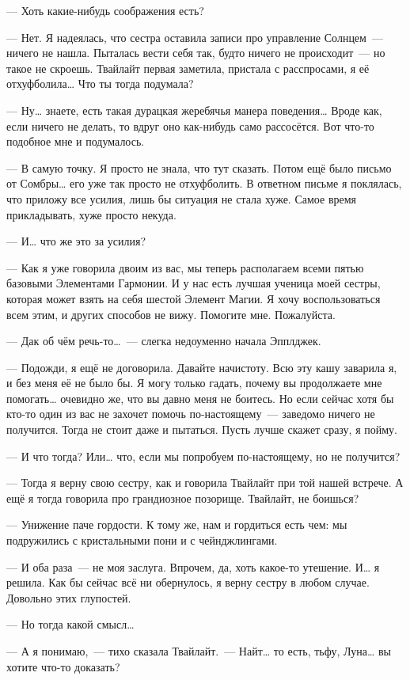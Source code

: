 \documentclass[twoside,a5paper,12pt]{extbook}
\begin{document}
— Хоть какие-нибудь соображения есть?

— Нет. Я надеялась, что сестра оставила записи про управление Солнцем — ничего не нашла. Пыталась вести себя так, будто ничего не происходит — но такое не скроешь. Твайлайт первая заметила, пристала с расспросами, я её отхуфболила… Что ты тогда подумала?

— Ну… знаете, есть такая дурацкая жеребячья манера поведения… Вроде как, если ничего не делать, то вдруг оно как-нибудь само рассосётся. Вот что-то подобное мне и подумалось.

— В самую точку. Я просто не знала, что тут сказать. Потом ещё было письмо от Сомбры… его уже так просто не отхуфболить. В ответном письме я поклялась, что приложу все усилия, лишь бы ситуация не стала хуже. Самое время прикладывать, хуже просто некуда.

— И… что же это за усилия?

— Как я уже говорила двоим из вас, мы теперь располагаем всеми пятью базовыми Элементами Гармонии. И у нас есть лучшая ученица моей сестры, которая может взять на себя шестой Элемент Магии. Я хочу воспользоваться всем этим, и других способов не вижу. Помогите мне. Пожалуйста.

— Дак об чём речь-то… — слегка недоуменно начала Эпплджек.

— Подожди, я ещё не договорила. Давайте начистоту. Всю эту кашу заварила я, и без меня её не было бы. Я могу только гадать, почему вы продолжаете мне помогать… очевидно же, что вы давно меня не боитесь. Но если сейчас хотя бы кто-то один из вас не захочет помочь по-настоящему — заведомо ничего не получится. Тогда не стоит даже и пытаться. Пусть лучше скажет сразу, я пойму.

— И что тогда? Или… что, если мы попробуем по-настоящему, но не получится?

— Тогда я верну свою сестру, как и говорила Твайлайт при той нашей встрече. А ещё я тогда говорила про грандиозное позорище. Твайлайт, не боишься?

— Унижение паче гордости. К тому же, нам и гордиться есть чем: мы подружились с кристальными пони и с чейнджлингами.

— И оба раза — не моя заслуга. Впрочем, да, хоть какое-то утешение. И… я решила. Как бы сейчас всё ни обернулось, я верну сестру в любом случае. Довольно этих глупостей.

— Но тогда какой смысл…

— А я понимаю, — тихо сказала Твайлайт. — Найт… то есть, тьфу, Луна… вы хотите что-то доказать?
\end{document}
